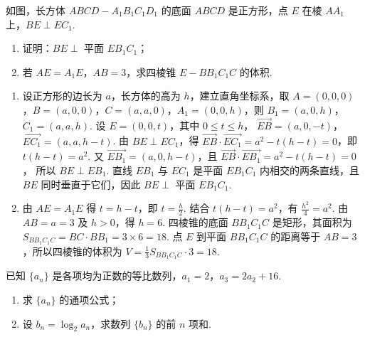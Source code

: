 \begin{problem}
如图，长方体 \(ABCD-A_1B_1C_1D_1\) 的底面 \(ABCD\) 是正方形，点 \(E\) 在棱 \(AA_1\) 上，\(BE\perp EC_1\).

\begin{enumerate}
\item 证明：\(BE\perp\) 平面 \(EB_1C_1\)；
\item 若 \(AE=A_1E\)，\(AB=3\)，求四棱锥 \(E-BB_1C_1C\) 的体积.
\end{enumerate}

\end{problem}

\begin{solution}
\begin{enumerate}
\item 设正方形的边长为 \(a\)，长方体的高为 \(h\)，建立直角坐标系，取 \(A=(0,0,0)\)，\(B=(a,0,0)\)，\(C=(a,a,0)\)，\(A_1=(0,0,h)\)，则 \(B_1=(a,0,h)\)，\(C_1=(a,a,h)\). 设 \(E=(0,0,t)\)，其中 \(0\le t\le h\)，
\(\overrightarrow{EB}=(a,0,-t)\)，\(\overrightarrow{EC_1}=(a,a,h-t)\). 由 \(BE\perp EC_1\)，得 \(\overrightarrow{EB}\cdot\overrightarrow{EC_1}=a^2-t(h-t)=0\)，即 \(t(h-t)=a^2\). 又 \(\overrightarrow{EB_1}=(a,0,h-t)\)，且 \(\overrightarrow{EB}\cdot\overrightarrow{EB_1}=a^2-t(h-t)=0\)，
所以 \(BE\perp EB_1\). 直线 \(EB_1\) 与 \(EC_1\) 是平面 \(EB_1C_1\) 内相交的两条直线，且 \(BE\) 同时垂直于它们，因此 \(BE\perp\) 平面 \(EB_1C_1\).

\item 由 \(AE=A_1E\) 得 \(t=h-t\)，即 \(t=\frac{h}{2}\). 结合 \(t(h-t)=a^2\)，有 \(\frac{h^2}{4}=a^2\). 由 \(AB=a=3\) 及 \(h>0\)，得 \(h=6\). 四棱锥的底面 \(BB_1C_1C\) 是矩形，其面积为 \(S_{BB_1C_1C}=BC\cdot BB_1=3\times6=18\). 点 \(E\) 到平面 \(BB_1C_1C\) 的距离等于 \(AB=3\)，所以四棱锥的体积为 \(V=\frac{1}{3}S_{BB_1C_1C}\cdot3=18\).
\end{enumerate}
\end{solution}

\begin{problem}
已知 \(\{a_n\}\) 是各项均为正数的等比数列，\(a_1=2\)，\(a_3=2a_2+16\).

\begin{enumerate}
\item 求 \(\{a_n\}\) 的通项公式；
\item 设 \(b_n=\log_2 a_n\)，求数列 \(\{b_n\}\) 的前 \(n\) 项和.
\end{enumerate}
\end{problem}

